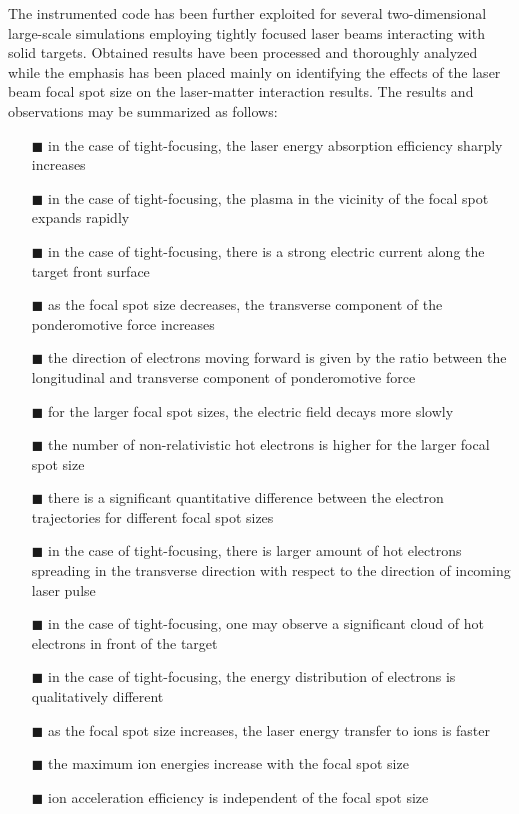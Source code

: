 The instrumented code has been further exploited for several two-dimensional large-scale simulations employing tightly focused laser beams interacting with solid targets. Obtained results have been processed and thoroughly analyzed while the emphasis has been placed mainly on identifying the effects of the laser beam focal spot size on the laser-matter interaction results. The results and observations may be summarized as follows:

\begin{itemize}
	\item[\tiny $\blacksquare$] in the case of tight-focusing, the laser energy absorption efficiency sharply increases
	\item[\tiny $\blacksquare$] in the case of tight-focusing, the plasma in the vicinity of the focal spot expands rapidly
	\item[\tiny $\blacksquare$] in the case of tight-focusing, there is a strong electric current along the target front surface
	\item[\tiny $\blacksquare$] as the focal spot size decreases, the transverse component of the ponderomotive force increases
	\item[\tiny $\blacksquare$] the direction of electrons moving forward is given by the ratio between the longitudinal and transverse component of ponderomotive force
	\item[\tiny $\blacksquare$] for the larger focal spot sizes, the electric field decays more slowly
	\item[\tiny $\blacksquare$] the number of non-relativistic hot electrons is higher for the larger focal spot size 
	\item[\tiny $\blacksquare$] there is a significant quantitative difference between the electron trajectories for different focal spot sizes
	\item[\tiny $\blacksquare$] in the case of tight-focusing, there is larger amount of hot electrons spreading in the transverse direction with respect to the direction of incoming laser pulse
	\item[\tiny $\blacksquare$] in the case of tight-focusing, one may observe a significant cloud of hot electrons in front of the target
	\item[\tiny $\blacksquare$] in the case of tight-focusing, the energy distribution of electrons is qualitatively different
	\item[\tiny $\blacksquare$] as the focal spot size increases, the laser energy transfer to ions is faster
	\item[\tiny $\blacksquare$] the maximum ion energies increase with the focal spot size
	\item[\tiny $\blacksquare$] ion acceleration efficiency is independent of the focal spot size
\end{itemize}

